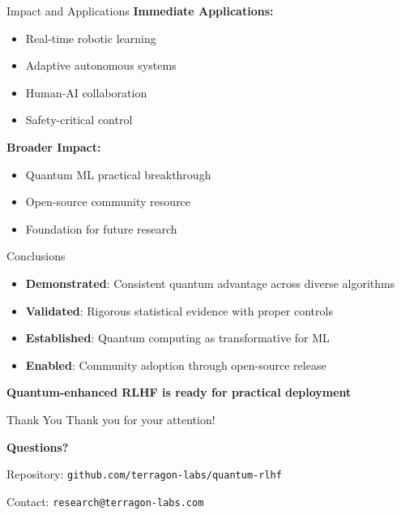 \documentclass{beamer}
\begin{document}
\begin{frame}{Impact and Applications}
\textbf{Immediate Applications:}
\begin{itemize}
\item Real-time robotic learning
\item Adaptive autonomous systems
\item Human-AI collaboration
\item Safety-critical control
\end{itemize}

\textbf{Broader Impact:}
\begin{itemize}
\item Quantum ML practical breakthrough
\item Open-source community resource
\item Foundation for future research
\end{itemize}
\end{frame}

\begin{frame}{Conclusions}
\begin{itemize}
\item \textbf{Demonstrated}: Consistent quantum advantage across diverse algorithms
\item \textbf{Validated}: Rigorous statistical evidence with proper controls
\item \textbf{Established}: Quantum computing as transformative for ML
\item \textbf{Enabled}: Community adoption through open-source release
\end{itemize}

\vspace{1cm}
\centering
\textbf{Quantum-enhanced RLHF is ready for practical deployment}
\end{frame}

\begin{frame}{Thank You}
\centering
\Large Thank you for your attention!

\vspace{1cm}
\normalsize
\textbf{Questions?}

\vspace{0.5cm}
Repository: \texttt{github.com/terragon-labs/quantum-rlhf}

\vspace{0.5cm}
Contact: \texttt{research@terragon-labs.com}
\end{frame}
\end{document}
